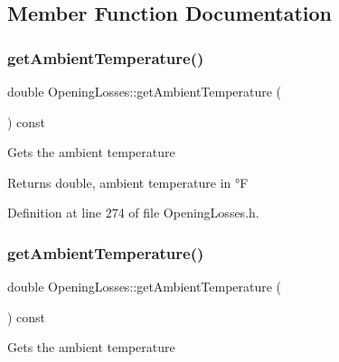\subsection{Member Function Documentation}
\mbox{\label{class_opening_losses_a198f46508744d6943846ea95a9513a45}} 
\subsubsection{\texorpdfstring{get\+Ambient\+Temperature()}{getAmbientTemperature()}\hspace{0.1cm}{\footnotesize\ttfamily [1/3]}}
{\footnotesize\ttfamily double Opening\+Losses\+::get\+Ambient\+Temperature (\begin{DoxyParamCaption}{ }\end{DoxyParamCaption}) const\hspace{0.3cm}{\ttfamily [inline]}}

Gets the ambient temperature

\begin{DoxyReturn}{Returns}
double, ambient temperature in °F 
\end{DoxyReturn}


Definition at line 274 of file Opening\+Losses.\+h.

\mbox{\label{class_opening_losses_a198f46508744d6943846ea95a9513a45}} 
\subsubsection{\texorpdfstring{get\+Ambient\+Temperature()}{getAmbientTemperature()}\hspace{0.1cm}{\footnotesize\ttfamily [2/3]}}
{\footnotesize\ttfamily double Opening\+Losses\+::get\+Ambient\+Temperature (\begin{DoxyParamCaption}{ }\end{DoxyParamCaption}) const\hspace{0.3cm}{\ttfamily [inline]}}

Gets the ambient temperature

